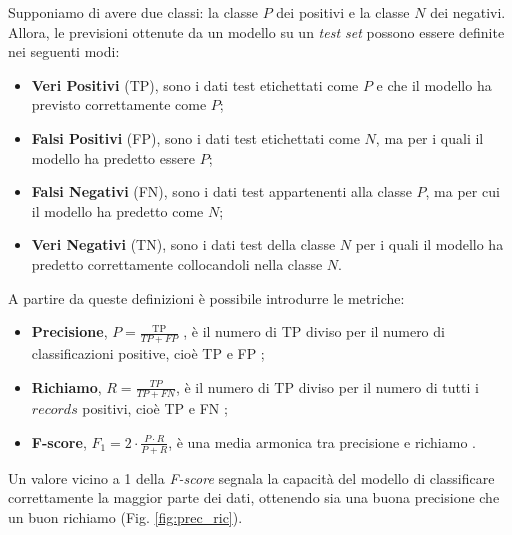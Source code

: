 Supponiamo di avere due classi: la classe $P$ dei positivi e la classe $N$ dei negativi.\\
Allora, le previsioni ottenute da un modello su un \textit{test set} possono essere definite nei seguenti modi:
\begin{itemize}
    \item \textbf{Veri Positivi} (TP), sono i dati test  etichettati come $P$ e che il modello ha previsto correttamente come $P$;
    \item \textbf{Falsi Positivi} (FP), sono i dati test etichettati come $N$, ma per i quali il modello ha predetto essere $P$;
    \item \textbf{Falsi Negativi} (FN), sono i dati test appartenenti alla classe $P$, ma per cui il modello ha predetto come $N$;
    \item \textbf{Veri Negativi} (TN), sono i dati test della classe $N$ per i quali il modello ha predetto correttamente collocandoli nella classe $N$.
\end{itemize}
A partire da queste definizioni è possibile introdurre le metriche:
\begin{itemize}
    \item \textbf{Precisione}, $P=\frac{\mathrm{TP}}{T P+F P}$ , è il numero di TP diviso per il numero di classificazioni positive, cioè TP e FP ; 
    \item \textbf{Richiamo}, $R=\frac{T P}{T P+F N}$, è il numero di TP diviso per il numero di tutti i $records$ positivi, cioè TP e FN ; 
    \item \textbf{F-score}, $F_{1}=2 \cdot \frac{P \cdot R}{P+R}$, è una media armonica tra precisione e richiamo .
\end{itemize}
Un valore vicino a 1 della \textit{F-score} segnala la capacità del modello di classificare correttamente la maggior parte dei dati, ottenendo sia una buona precisione che un buon richiamo (Fig. \ref{fig:prec_ric}). 

